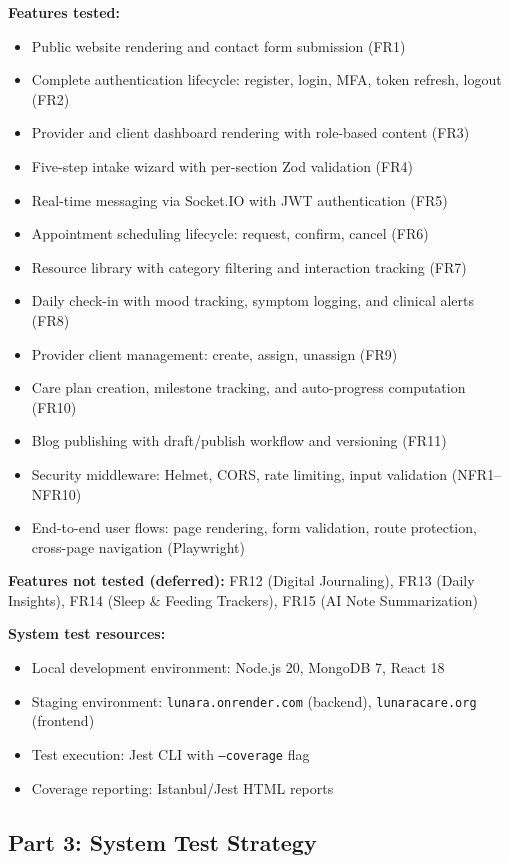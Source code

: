 \documentclass[12pt,letterpaper]{article}
\begin{document}
\textbf{Features tested:}
\begin{itemize}[nosep]
  \item Public website rendering and contact form submission (FR1)
  \item Complete authentication lifecycle: register, login, MFA, token refresh, logout (FR2)
  \item Provider and client dashboard rendering with role-based content (FR3)
  \item Five-step intake wizard with per-section Zod validation (FR4)
  \item Real-time messaging via Socket.IO with JWT authentication (FR5)
  \item Appointment scheduling lifecycle: request, confirm, cancel (FR6)
  \item Resource library with category filtering and interaction tracking (FR7)
  \item Daily check-in with mood tracking, symptom logging, and clinical alerts (FR8)
  \item Provider client management: create, assign, unassign (FR9)
  \item Care plan creation, milestone tracking, and auto-progress computation (FR10)
  \item Blog publishing with draft/publish workflow and versioning (FR11)
  \item Security middleware: Helmet, CORS, rate limiting, input validation (NFR1--NFR10)
  \item End-to-end user flows: page rendering, form validation, route protection, cross-page navigation (Playwright)
\end{itemize}

\textbf{Features not tested (deferred):} FR12 (Digital Journaling), FR13 (Daily Insights), FR14 (Sleep \& Feeding Trackers), FR15 (AI Note Summarization)

\textbf{System test resources:}
\begin{itemize}[nosep]
  \item Local development environment: Node.js 20, MongoDB 7, React 18
  \item Staging environment: \texttt{lunara.onrender.com} (backend), \texttt{lunaracare.org} (frontend)
  \item Test execution: Jest CLI with \texttt{--coverage} flag
  \item Coverage reporting: Istanbul/Jest HTML reports
\end{itemize}

\subsection{Part 3: System Test Strategy}
\end{document}
